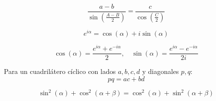 \begin{proposición}
$$\frac{a - b}{\sin\left(\frac{A - B}{2}\right)} = \frac{c}{\cos\left(\frac{C}{2}\right)}$$
\end{proposición}

\begin{proposición}
$$e^{i\alpha} = \cos(\alpha) + i\sin(\alpha)$$
\end{proposición}

\begin{proposición}
$$\cos(\alpha) = \frac{e^{i\alpha} + e^{-i\alpha}}{2}, \quad \sin(\alpha) = \frac{e^{i\alpha} - e^{-i\alpha}}{2i}$$
\end{proposición}

\begin{proposición}
Para un cuadrilátero cíclico con lados $a, b, c, d$ y diagonales $p, q$:
$$pq = ac + bd$$
\end{proposición}

\begin{proposición}
$$\sin^2(\alpha) + \cos^2(\alpha + \beta) = \cos^2(\alpha) + \sin^2(\alpha + \beta)$$
\end{proposición}

